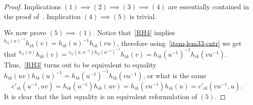 \documentclass[oneside, 12pt]{amsart}
\theoremstyle{plain}
\numberwithin{equation}{section}
\numberwithin{lemma}{section}
\theoremstyle{remark}
\theoremstyle{definition}
\begin{document}
\begin{proof}
Implications $(1) \implies (2) \implies (3) \implies (4)$ are essentially contained in the proof of~\cite[Lemmas~2.1-2.2]{Reh78}.
Implication $(4) \implies (5)$ is trivial.

We now prove $(5) \implies (1)$. Notice that~\eqref{RH4} implies ${}^{h_{ij}(u)^{-1}}h_{ik}(v) = h_{ik}(u)^{-1} h_{ik}(vu)$, therefore
using~\cref{item-lem33-cntr} we get that ${}^{h_{ij}(u)}h_{ik}(v) = {}^{c_{ij}(u, u^{-1}) h_{ij}(u^{-1})^{-1}}h_{ik}(v) = h_{ik}(u^{-1})^{-1} h_{ik}(vu^{-1}).$
Thus,~\eqref{RH3} turns out to be equivalent to equality $h_{ik}(uv) h_{ik}(u)^{-1} = h_{ik}(u^{-1})^{-1} h_{ik}(vu^{-1})$, or what is the same
\[c'_{ik}(u^{-1}, uv) = h_{ik}(u^{-1}) h_{ik}(uv) =  h_{ik}(vu^{-1}) h_{ik}(u) = c'_{ik}(vu^{-1}, u).\]
It is clear that the last equality is an equivalent reformulation of $(5)$.
\end{proof}
\end{document}
